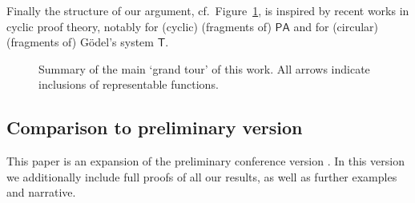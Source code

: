 \documentclass[10pt,a4paper]{amsart}
\theoremstyle{plain}
\theoremstyle{definition}
\theoremstyle{plain}
\theoremstyle{definition} %
\newcommand{\closure}[1]{\langle #1 \rangle}
\newcommand{\LJ}{\mathsf{LJ}}
\newcommand{\T}{\mathsf{T}}
\newcommand{\muLJ}{\mu\LJ}
\newcommand{\muLJneg}{\muLJ^-}
\newcommand{\circular}{\mathsf C}
\newcommand{\cmuLJ}{\circular\muLJ}
\newcommand{\cmuLJneg}{\cmuLJ^-}
\newcommand{\Pin}[2]{\Pi^{#1}_{#2}}
\newcommand{\PA}{\mathsf{PA}}
\newcommand{\HA}{\mathsf{HA}}
\newcommand{\muPA}{\mu\PA}
\newcommand{\muHA}{\mu\HA}
\newcommand{\CA}{\mathsf{CA}}
\newcommand{\ca}[1]{#1\text{-}\CA}
\newcommand{\PSCA}{\ca{\Pin 1 2 }_0}
\newcommand{\muHAneg}{\muHA^-}
\begin{document}
Finally the structure of our argument, cf.~Figure~\ref{fig:grand-tour}, is inspired by recent works in cyclic proof theory, notably \cite{Simpson17:cyc-arith,Das20:ca-log-comp} for (cyclic) (fragments of) $\PA$ and \cite{Das21:CT-preprint,Das21:CT-fscd,KuperbergPP21systemT} for (circular) (fragments of) G\"odel's system $\T$.


\begin{figure}
    \caption{Summary of the main `grand tour' of this work. All arrows indicate inclusions of representable functions.
    }
    \label{fig:grand-tour}
\end{figure}

\subsection{Comparison to preliminary version}
This paper is an expansion of the preliminary conference version \cite{CD23:muLJ-lics}.
In this version we additionally include full proofs of all our results, as well as further examples and narrative. 
\end{document}
